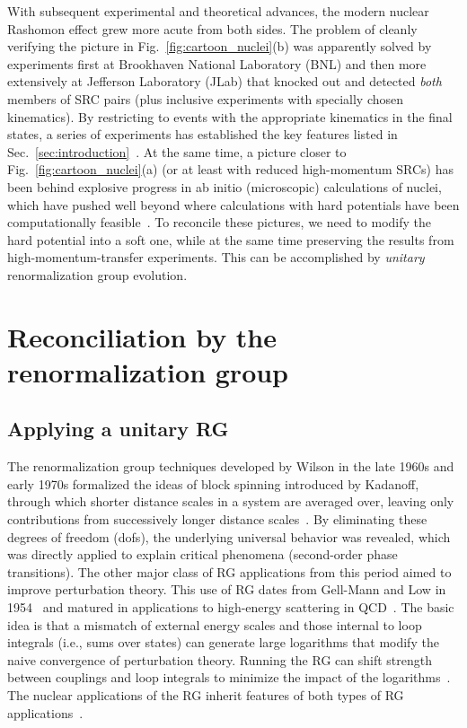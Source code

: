 \documentclass[10pt,aps,prc,floatfix,twocolumn,nofootinbib]{revtex4-1}
\begin{document}
With subsequent experimental and theoretical advances, the modern nuclear Rashomon effect grew more acute from both sides.
The problem of cleanly verifying the picture in Fig.~\ref{fig:cartoon_nuclei}(b) was apparently solved by experiments first at Brookhaven National Laboratory (BNL) and then more extensively at Jefferson Laboratory (JLab) that knocked out and detected \emph{both} members of SRC pairs (plus inclusive experiments with specially chosen kinematics).
By restricting to events with the appropriate kinematics in the final states, a series of experiments has established the key features listed in Sec.~\ref{sec:introduction}~\cite{Hen:2016kwk}.
At the same time, a picture closer to Fig.~\ref{fig:cartoon_nuclei}(a) (or at least with reduced high-momentum SRCs) has been behind explosive progress in ab initio (microscopic) calculations of nuclei, which have pushed well beyond where calculations with hard potentials have been computationally feasible~\cite{Hergert:2020bxy}.
To reconcile these pictures, we need to modify the hard potential into a soft one, while at the same time preserving the results from high-momentum-transfer experiments.
This can be accomplished by \emph{unitary} renormalization group evolution.


\section{Reconciliation by the renormalization group} \label{sec:reconciliation}

\subsection{Applying a unitary RG}

The renormalization group techniques developed by Wilson in the late 1960s and early 1970s formalized the ideas of block spinning introduced by Kadanoff, through which shorter distance scales in a system are averaged over, leaving only contributions from successively longer distance scales~\cite{PhysicsPhysiqueFizika.2.263,Wilson:1971bg,Wilson:1974mb}.
By eliminating these degrees of freedom (dofs), the underlying universal behavior was revealed, which was directly applied to explain critical phenomena (second-order phase transitions).
The other major class of RG applications from this period aimed to improve perturbation theory.
This use of RG dates from Gell-Mann and Low in 1954~\cite{GellMann:1954fq} and matured in applications to high-energy scattering in QCD~\cite{Gross:1973id,Politzer:1973fx}.
The basic idea is that a mismatch of external energy scales and those internal to loop integrals (i.e., sums over states) can generate large logarithms that modify the naive convergence of perturbation theory.
Running the RG can shift strength between couplings and loop integrals to minimize the impact of the logarithms~\cite{Weinberg:1981qq}.
The nuclear applications of the RG inherit features of both types of RG applications~\cite{Bogner:2006vp}.
\end{document}
